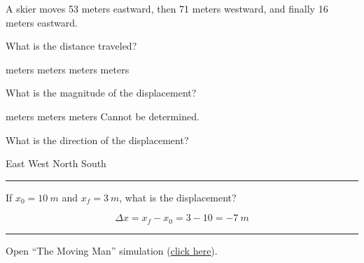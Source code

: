 \documentclass[answers]{exam}
\begin{document}
\begin{questions}
\begin{questions}
\begin{EnvUplevel}
A skier moves 53 meters eastward, then 71 meters westward, and finally 16 meters eastward. 
\end{EnvUplevel}


\question \label{ques:Skier_start}
What is the distance traveled?

\begin{choices}
 meters
 meters
 meters
 meters
\end{choices}

\question
What is the magnitude of the displacement?

\begin{choices}
 meters
 meters
 meters
\choice Cannot be determined.
\end{choices}

\question \label{ques:Skier_end}
What is the direction of the displacement?

\begin{choices}
\choice East
\CorrectChoice West
\choice North   
\choice South
\end{choices}

\vspace{1em} \hrule

\question
If $x_0 = \SI{10}{m}$ and $x_f = \SI{3}{m}$, what is the displacement?

\begin{solution}
\begin{equation*}
    \Delta{x} = x_f - x_0 = 3 - 10 = \SI{-7}{m} 
\end{equation*}
\end{solution}


\vspace{1em}
\hrule

\question
Open ``The Moving Man'' simulation (\href{https://archive.cnx.org/specials/e2ca52af-8c6b-450e-ac2f-9300b38e8739/moving-man/}{click here}). 

\end{questions}
\end{questions}
\end{document}
